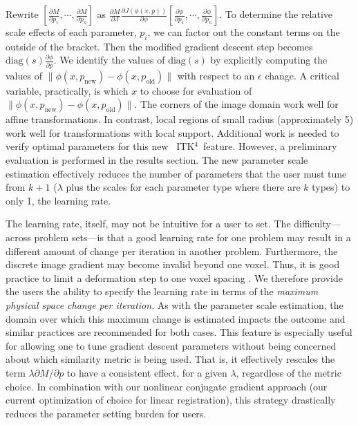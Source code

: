 \documentclass{frontiersSCNS}
\newcommand{\tk}{~ITK$^{\text{4}}$~}
\begin{document}
Rewrite $[ \frac{\partial
  M}{\partial p_1} , \cdots , \frac{\partial
  M}{\partial p_n} 
 ]$ as $\frac{\partial M}{\partial J}\frac{\partial
  J(\phi(x,p))}{\partial \phi} [ \frac{\partial \phi}{\partial p_1} , \cdots , \frac{\partial \phi}{\partial p_n} ]$.
To determine the relative scale effects of each parameter, $p_i$, we
can factor out the constant terms on the outside of the bracket.  
Then the modified gradient descent step becomes
$\text{diag}(s)\frac{\partial \phi}{\partial p}$.  We identify the values
of $\text{diag}(s)$ by explicitly computing the values of $\| \phi(x,p_{\text{new}}) -
\phi(x,p_\text{old}) \| $ with respect to an $\epsilon$ change.  A critical variable,
practically, is which $x$ to choose for evaluation of $\| \phi(x,p_{\text{new}}) -
\phi(x,p_\text{old}) \| $.  The corners of the image domain work well
for affine transformations.  In contrast, local regions of small radius
(approximately 5) work well for transformations with local support.
Additional work is needed to verify optimal parameters for this new
\tk feature.  However, a preliminary evaluation is performed in the results
section.  The new parameter scale estimation effectively reduces the number of parameters
that the user must tune from $k+1$ ($\lambda$ plus the scales for each
parameter type where there are $k$ types) to only 1, the learning
rate.  

The learning rate, itself, may not be intuitive for a user to set.
The difficulty---across problem sets---is that a good learning rate for
one problem may result in a different amount of change per iteration
in another problem.  Furthermore, the discrete image gradient may
become invalid beyond one voxel.  Thus, it is good practice to limit a deformation step to one voxel spacing
\cite{Jenkinson2001}.  We therefore provide the users the ability to
specify the learning rate in terms of the \textit{maximum physical space change
  per iteration}.  As with the parameter scale estimation, the domain
over which this maximum change is estimated impacts the outcome and
similar practices are recommended for both cases.   This feature is
especially useful for allowing one to tune gradient descent parameters
without being concerned about which similarity metric is being used.
That is, it effectively rescales the term $\lambda \partial M / \partial p$ to
have a consistent effect, for a given $\lambda$, regardless of the
metric choice.  In combination with our nonlinear conjugate gradient
approach (our current optimization of choice for linear registration),
this strategy drastically reduces the parameter setting burden for
users. 
\end{document}
